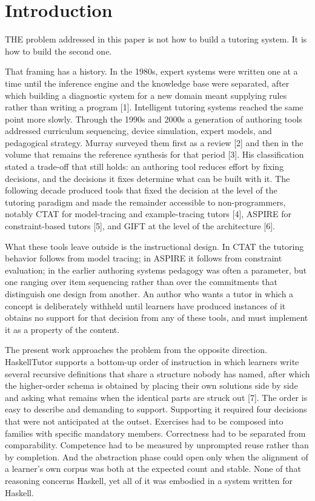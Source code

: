 \documentclass[10pt,twocolumn,letterpaper]{article}
\begin{document}
\section{Introduction}
THE problem addressed in this paper is not how to build a tutoring
system. It is how to build the second one.

That framing has a history. In the 1980s, expert systems were written
one at a time until the inference engine and the knowledge base were
separated, after which building a diagnostic system for a new domain
meant supplying rules rather than writing a program [1]. Intelligent
tutoring systems reached the same point more slowly. Through the 1990s
and 2000s a generation of authoring tools addressed curriculum
sequencing, device simulation, expert models, and pedagogical strategy.
Murray surveyed them first as a review [2] and then in the volume
that remains the reference synthesis for that period [3]. His
classification stated a trade-off that still holds: an authoring tool
reduces effort by fixing decisions, and the decisions it fixes determine
what can be built with it. The following decade produced tools that
fixed the decision at the level of the tutoring paradigm and made the
remainder accessible to non-programmers, notably CTAT for model-tracing
and example-tracing tutors [4], ASPIRE for constraint-based tutors
[5], and GIFT at the level of the architecture [6].

What these tools leave outside is the instructional design. In CTAT the
tutoring behavior follows from model tracing; in ASPIRE it follows from
constraint evaluation; in the earlier authoring systems pedagogy was
often a parameter, but one ranging over item sequencing rather than over
the commitments that distinguish one design from another. An author who
wants a tutor in which a concept is deliberately withheld until learners
have produced instances of it obtains no support for that decision from
any of these tools, and must implement it as a property of the content.

The present work approaches the problem from the opposite direction.
HaskellTutor supports a bottom-up order of instruction in which learners
write several recursive definitions that share a structure nobody has
named, after which the higher-order schema is obtained by placing their
own solutions side by side and asking what remains when the identical
parts are struck out [7]. The order is easy to describe and
demanding to support. Supporting it required four decisions that were
not anticipated at the outset. Exercises had to be composed into
families with specific mandatory members. Correctness had to be
separated from comparability. Competence had to be measured by
unprompted reuse rather than by completion. And the abstraction phase
could open only when the alignment of a learner's own corpus was both at
the expected count and stable. None of that reasoning concerns Haskell,
yet all of it was embodied in a system written for Haskell.
\end{document}
